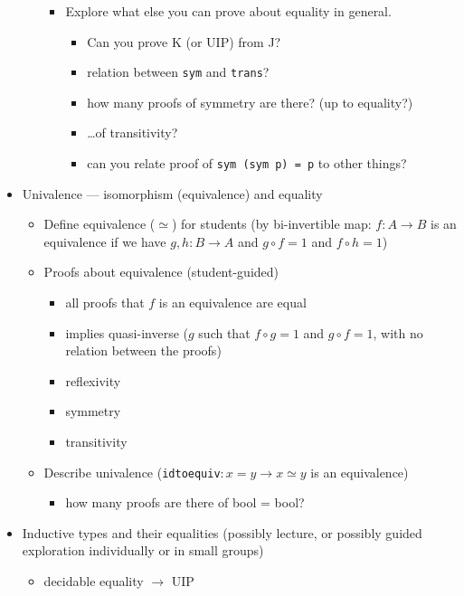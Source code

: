 \documentclass{article}
\begin{document}
\begin{itemize}
\begin{itemize}
\begin{itemize}
        \item Explore what else you can prove about equality in general.
        \begin{itemize}
          \item Can you prove K (or UIP) from J?
          \item relation between \texttt{sym} and \texttt{trans}?
          \item how many proofs of symmetry are there? (up to equality?)
          \item \ldots\space of transitivity?
          \item can you relate proof of \texttt{sym (sym p) = p} to other things?
        \end{itemize}
      \end{itemize}
    \end{itemize}
    \item Univalence --- isomorphism (equivalence) and equality
    \begin{itemize}
      \item Define equivalence ($\simeq$) for students (by bi-invertible map: $f : A \to B$ is an equivalence if we have $g, h : B \to A$ and $g \circ f = 1$ and $f \circ h = 1$)
      \item Proofs about equivalence (student-guided)
      \begin{itemize}
        \item all proofs that $f$ is an equivalence are equal
        \item implies quasi-inverse ($g$ such that $f \circ g = 1$ and $g \circ f = 1$, with no relation between the proofs)
        \item reflexivity
        \item symmetry
        \item transitivity
      \end{itemize}
      \item Describe univalence (\texttt{idtoequiv}$ : x = y \to x \simeq y$ is an equivalence)
      \begin{itemize}
        \item how many proofs are there of bool = bool?
      \end{itemize}
    \end{itemize}
    \item Inductive types and their equalities (possibly lecture, or possibly guided exploration individually or in small groups)
    \begin{itemize}
      \item decidable equality $\to$ UIP

\end{itemize}
\end{itemize}
\end{document}
